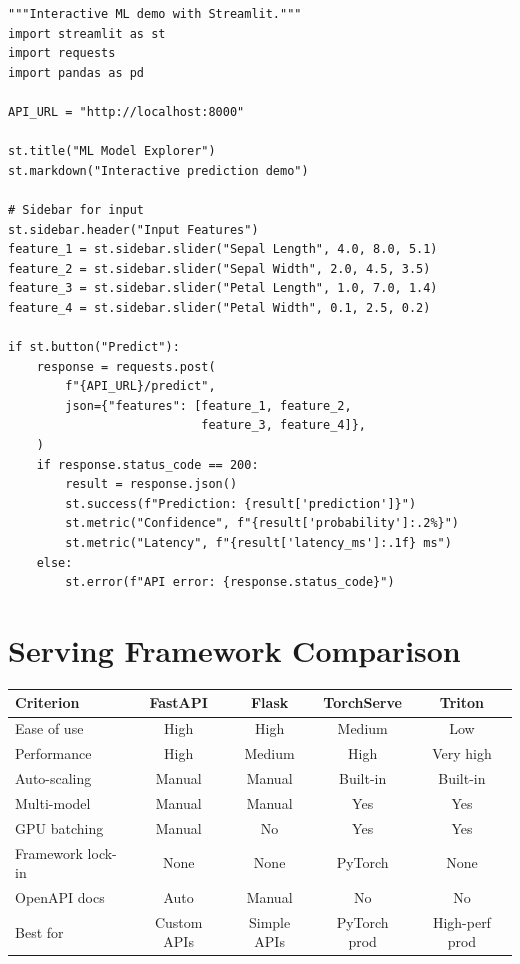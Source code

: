 \begin{codeblock}[title=\textbf{Streamlit ML demo application}]
\begin{verbatim}
"""Interactive ML demo with Streamlit."""
import streamlit as st
import requests
import pandas as pd

API_URL = "http://localhost:8000"

st.title("ML Model Explorer")
st.markdown("Interactive prediction demo")

# Sidebar for input
st.sidebar.header("Input Features")
feature_1 = st.sidebar.slider("Sepal Length", 4.0, 8.0, 5.1)
feature_2 = st.sidebar.slider("Sepal Width", 2.0, 4.5, 3.5)
feature_3 = st.sidebar.slider("Petal Length", 1.0, 7.0, 1.4)
feature_4 = st.sidebar.slider("Petal Width", 0.1, 2.5, 0.2)

if st.button("Predict"):
    response = requests.post(
        f"{API_URL}/predict",
        json={"features": [feature_1, feature_2,
                           feature_3, feature_4]},
    )
    if response.status_code == 200:
        result = response.json()
        st.success(f"Prediction: {result['prediction']}")
        st.metric("Confidence", f"{result['probability']:.2%}")
        st.metric("Latency", f"{result['latency_ms']:.1f} ms")
    else:
        st.error(f"API error: {response.status_code}")
\end{verbatim}
\end{codeblock}

\section{Serving Framework Comparison}
\label{sec:serving-comparison}

\begin{center}
\begin{tabular}{@{}lcccc@{}}
\toprule
\textbf{Criterion} & \textbf{FastAPI} & \textbf{Flask} &
  \textbf{TorchServe} & \textbf{Triton} \\
\midrule
Ease of use & High & High & Medium & Low \\
Performance & High & Medium & High & Very high \\
Auto-scaling & Manual & Manual & Built-in & Built-in \\
Multi-model & Manual & Manual & Yes & Yes \\
GPU batching & Manual & No & Yes & Yes \\
Framework lock-in & None & None & PyTorch & None \\
OpenAPI docs & Auto & Manual & No & No \\
Best for & Custom APIs & Simple APIs & PyTorch prod & High-perf prod \\
\bottomrule
\end{tabular}
\end{center}

